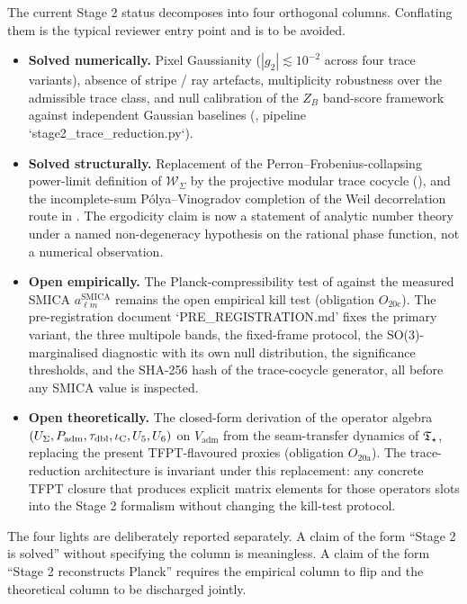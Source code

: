 \begin{remark}
\label{rem:stage2-traffic-light}
The current Stage 2 status decomposes into four orthogonal columns. Conflating them is the
typical reviewer entry point and is to be avoided.
\begin{itemize}[leftmargin=2.0em,topsep=3pt,itemsep=2pt]
\item \textbf{Solved numerically.} Pixel Gaussianity ($|g_2|\lesssim 10^{-2}$ across four
trace variants), absence of stripe / ray artefacts, multiplicity robustness over the
admissible trace class, and null calibration of the $Z_B$ band-score framework against
independent Gaussian baselines (, pipeline
`stage2\_trace\_reduction.py`).
\item \textbf{Solved structurally.} Replacement of the Perron--Frobenius-collapsing power-limit
definition of $\mathcal W_\Sigma$ by the projective modular trace cocycle
(), and the incomplete-sum P\'olya--Vinogradov
completion of the Weil decorrelation route in . The
ergodicity claim is now a statement of analytic number theory under a named
non-degeneracy hypothesis on the rational phase function, not a numerical observation.
\item \textbf{Open empirically.} The Planck-compressibility test of
 against the measured SMICA $a_{\ell m}^{\mathrm{SMICA}}$
remains the open empirical kill test (obligation $O_{20\mathrm{c}}$). The pre-registration
document `PRE\_REGISTRATION.md' fixes the primary variant, the three multipole bands, the
fixed-frame protocol, the SO(3)-marginalised diagnostic with its own null distribution, the
significance thresholds, and the SHA-256 hash of the trace-cocycle generator, all before any
SMICA value is inspected.
\item \textbf{Open theoretically.} The closed-form derivation of the operator algebra
$(U_\Sigma,P_{\mathrm{adm}},\tau_{\mathrm{dbl}},\iota_{\mathrm C},U_5,U_6)$ on $V_{\mathrm{adm}}$ from the seam-transfer dynamics
of $\mathfrak T_{\star}$, replacing the present TFPT-flavoured proxies (obligation $O_{20\mathrm{a}}$).
The trace-reduction architecture is invariant under this replacement: any concrete TFPT
closure that produces explicit matrix elements for those operators slots into the Stage 2
formalism without changing the kill-test protocol.
\end{itemize}
The four lights are deliberately reported separately. A claim of the form ``Stage 2 is
solved'' without specifying the column is meaningless. A claim of the form
``Stage 2 reconstructs Planck'' requires the empirical column to flip and the theoretical
column to be discharged jointly.
\end{remark}
